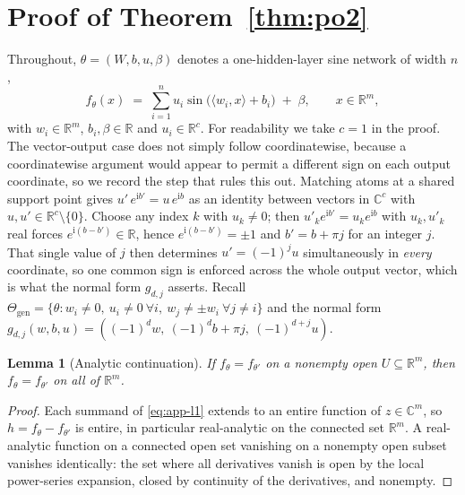\documentclass[10pt,twocolumn,letterpaper]{article}
\newtheorem{lemma}[theorem]{Lemma}
\theoremstyle{definition}
\newcommand{\R}{\mathbb{R}}
\newcommand{\C}{\mathbb{C}}
\newcommand{\Thgen}{\Theta_{\mathrm{gen}}}
\begin{document}
\appendix
\onecolumn
\normalsize
\section{Proof of Theorem~\ref{thm:po2}}\label{app:po2}

Throughout, $\theta = (W,b,u,\beta)$ denotes a one-hidden-layer sine network of width $n$,
\begin{equation}
f_\theta(x) \;=\; \sum_{i=1}^{n} u_i \sin\!\big(\langle w_i, x\rangle + b_i\big) \;+\; \beta,
\qquad x \in \R^m,
\label{eq:app-l1}
\end{equation}
with $w_i \in \R^m$, $b_i,\beta \in \R$ and $u_i \in \R^c$. For readability we take $c=1$ in the
proof. The vector-output case does not simply follow coordinatewise, because a coordinatewise
argument would appear to permit a different sign on each output coordinate, so we record the step
that rules this out. Matching atoms at a shared support point gives $u'\,e^{\mathrm i b'} =
u\,e^{\mathrm i b}$ as an identity between vectors in $\C^c$ with $u, u' \in \R^c \setminus
\{0\}$. Choose any index $k$ with $u_k \ne 0$; then $u'_k e^{\mathrm i b'} = u_k e^{\mathrm i b}$
with $u_k, u'_k$ real forces $e^{\mathrm i (b - b')} \in \R$, hence $e^{\mathrm i (b-b')} = \pm 1$
and $b' = b + \pi j$ for an integer $j$. That single value of $j$ then determines
$u' = (-1)^{j} u$ simultaneously in \emph{every} coordinate, so one common sign is enforced across
the whole output vector, which is what the normal form $g_{d,j}$ asserts. Recall
$\Thgen = \{\theta : w_i \neq 0,\ u_i \neq 0\ \forall i,\ w_j \neq \pm w_i\ \forall j \neq i\}$ and
the normal form $g_{d,j}(w,b,u) = ((-1)^d w,\ (-1)^d b + \pi j,\ (-1)^{d+j}u)$.

\begin{lemma}[Analytic continuation]\label{lem:app-analytic}
If $f_\theta = f_{\theta'}$ on a nonempty open $U \subseteq \R^m$, then $f_\theta = f_{\theta'}$
on all of $\R^m$.
\end{lemma}

\begin{proof}
Each summand of \eqref{eq:app-l1} extends to an entire function of $z \in \C^m$, so
$h = f_\theta - f_{\theta'}$ is entire, in particular real-analytic on the connected set $\R^m$. A
real-analytic function on a connected open set vanishing on a nonempty open subset vanishes
identically: the set where all derivatives vanish is open by the local power-series expansion,
closed by continuity of the derivatives, and nonempty.
\end{proof}
\end{document}
